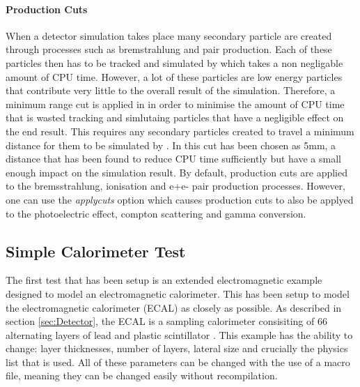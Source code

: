 \paragraph{Production Cuts}\label{sec:products}When a detector simulation takes place many secondary particle are created through processes such as bremstrahlung and pair production.  Each of these particles then has to be tracked and simulated by \geant which takes a non negligable amount of CPU time. However, a lot of these particles are low energy particles that contribute very little to the overall result of the simulation.  Therefore, a minimum range cut is applied in \geant in order to minimise the amount of CPU time that is wasted tracking and simlutaing particles that have a negligible effect on the end result.  This requires any secondary particles created to travel a minimum distance for them to be simulated by \geant.  In \lhcb this cut has been chosen as 5mm, a distance that has been found to reduce CPU time sufficiently but have a small enough impact on the simulation result. By default, production cuts are applied to the bremsstrahlung, ionisation and e+e- pair production processes.  However, one can use the \textit{applycuts} option which causes production cuts to also be applyed to the photoelectric effect, compton scattering and gamma conversion.


\subsection{Simple Calorimeter Test}
\label{sec:Simple Calorimeter Test}
The first test that has been setup is an extended electromagnetic \geant example designed to model an electromagnetic calorimeter.  This has been setup to model the \lhcb electromagnetic calorimeter (ECAL) as closely as possible. As described in section \ref{sec:Detector}, the \lhcb ECAL is a sampling calorimeter consisiting of 66 alternating layers of lead and plastic scintillator \cite{LHCb-TDR-002}.  This example has the ability to change: layer thicknesses, number of layers, lateral size and crucially the physics list that is used. All of these parameters can be changed with the use of a \geant macro file, meaning they can be changed easily without recompilation. 

